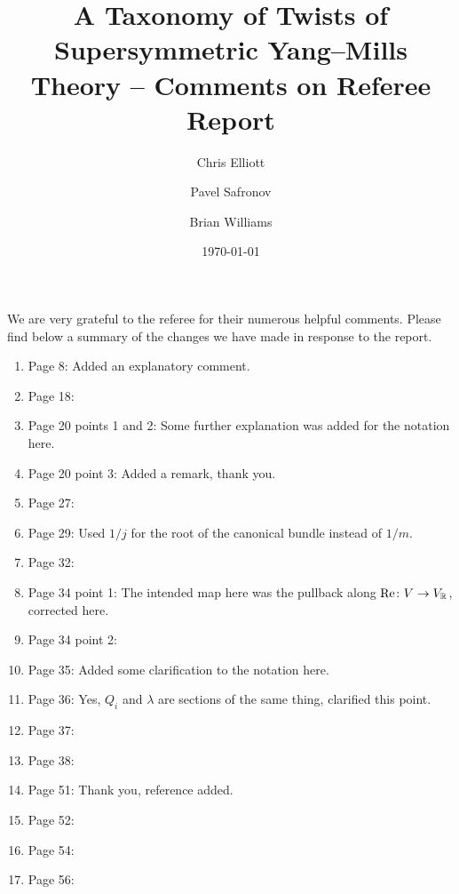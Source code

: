 \documentclass[10pt, oneside]{article}
\title{A Taxonomy of Twists of Supersymmetric Yang--Mills Theory -- Comments on Referee Report}
\author{Chris Elliott\and Pavel Safronov \and Brian Williams}
\date{\today}
\begin{document}
\maketitle

We are very grateful to the referee for their numerous helpful comments.  Please find below a summary of the changes we have made in response to the report.

\begin{enumerate}
 \item Page 8: Added an explanatory comment.
 \item Page 18:
 \item Page 20 points 1 and 2: Some further explanation was added for the notation here.
 \item Page 20 point 3: Added a remark, thank you.
 \item Page 27:
 \item Page 29: Used $1/j$ for the root of the canonical bundle instead of $1/m$.
 \item Page 32:
 \item Page 34 point 1: The intended map here was the pullback along $\mathrm{Re} \colon V \to V_\mathbb R$, corrected here. 
 \item Page 34 point 2:
 \item Page 35: Added some clarification to the notation here.
 \item Page 36: Yes, $Q_i$ and $\lambda$ are sections of the same thing, clarified this point. 
 \item Page 37:
 \item Page 38:
 \item Page 51: Thank you, reference added.
 \item Page 52:
 \item Page 54:
 \item Page 56:
\end{enumerate}

 
\end{document}
